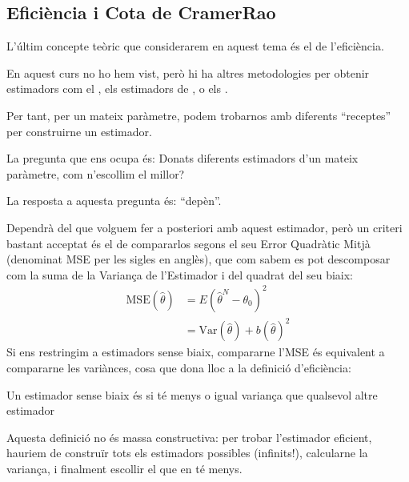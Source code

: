 \documentclass[letterpaper,10pt,english]{sphinxmanual}
\begin{document}
\subsection{Eficiència i Cota de Cramer\sphinxhyphen{}Rao}
\label{\detokenize{0_Intro/0_3_Estimacio:eficiencia-i-cota-de-cramer-rao}}
L’últim concepte teòric que considerarem en aquest tema
és el de l’eficiència.

En aquest curs no ho hem vist, però hi ha altres metodologies
per obtenir estimadors com el ,
els estimadors de ,
o els .

Per tant, per un mateix paràmetre, podem trobar\sphinxhyphen{}nos amb diferents
“receptes” per construir\sphinxhyphen{}ne un estimador.

La pregunta que ens ocupa és: Donats diferents estimadors d’un mateix paràmetre, com n’escollim el millor?

La resposta a aquesta pregunta és: “depèn”.

Dependrà del que volguem
fer a posteriori amb aquest estimador, però un criteri bastant acceptat
és el de comparar\sphinxhyphen{}los segons el seu Error Quadràtic Mitjà (denominat MSE per les sigles en anglès), que
com sabem es pot descomposar com la suma de la Variança de l’Estimador
i del quadrat del seu biaix:
\begin{equation*}
\begin{split}\mbox{MSE}(\hat{\theta}) & = E(\hat{\theta}^N - \theta_0)^2 \\
                         & = \mbox{Var}(\hat{\theta}) + b(\hat{\theta})^2\end{split}
\end{equation*}
Si ens restringim a estimadors sense biaix, comparar\sphinxhyphen{}ne l’MSE és
equivalent a comparar\sphinxhyphen{}ne les variànces, cosa que dona lloc a la definició
d’eficiència:

Un estimador sense biaix és  si té menys o igual variança que
qualsevol altre estimador

Aquesta definició no és massa constructiva: per trobar l’estimador eficient,
hauriem de construïr tots els estimadors possibles (infinits!), calcular\sphinxhyphen{}ne
la variança, i finalment escollir el que en té menys.
\end{document}
